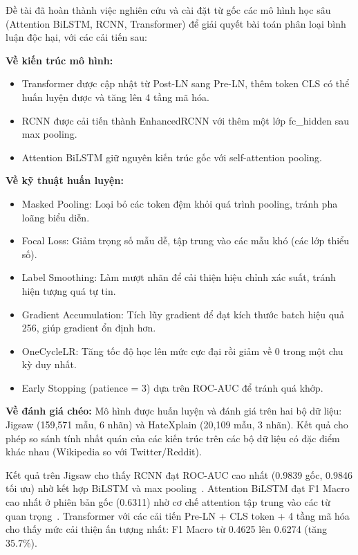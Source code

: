 \documentclass[../BTL.tex]{subfiles}
\begin{document}
Đề tài đã hoàn thành việc nghiên cứu và cài đặt từ gốc các mô hình học sâu (Attention BiLSTM, RCNN, Transformer) để giải quyết bài toán phân loại bình luận độc hại, với các cải tiến sau:

\textbf{Về kiến trúc mô hình:}
\begin{itemize}
    \item Transformer được cập nhật từ Post-LN sang Pre-LN, thêm token CLS có thể huấn luyện được và tăng lên 4 tầng mã hóa.
    \item RCNN được cải tiến thành EnhancedRCNN với thêm một lớp fc\_hidden sau max pooling.
    \item Attention BiLSTM giữ nguyên kiến trúc gốc với self-attention pooling.
\end{itemize}

\textbf{Về kỹ thuật huấn luyện:}
\begin{itemize}
    \item Masked Pooling: Loại bỏ các token đệm khỏi quá trình pooling, tránh pha loãng biểu diễn.
    \item Focal Loss: Giảm trọng số mẫu dễ, tập trung vào các mẫu khó (các lớp thiểu số).
    \item Label Smoothing: Làm mượt nhãn để cải thiện hiệu chỉnh xác suất, tránh hiện tượng quá tự tin.
    \item Gradient Accumulation: Tích lũy gradient để đạt kích thước batch hiệu quả 256, giúp gradient ổn định hơn.
    \item OneCycleLR: Tăng tốc độ học lên mức cực đại rồi giảm về 0 trong một chu kỳ duy nhất.
    \item Early Stopping (patience = 3) dựa trên ROC-AUC để tránh quá khớp.
\end{itemize}

\textbf{Về đánh giá chéo:} Mô hình được huấn luyện và đánh giá trên hai bộ dữ liệu: Jigsaw (159,571 mẫu, 6 nhãn) và HateXplain (20,109 mẫu, 3 nhãn). Kết quả cho phép so sánh tính nhất quán của các kiến trúc trên các bộ dữ liệu có đặc điểm khác nhau (Wikipedia so với Twitter/Reddit).

Kết quả trên Jigsaw cho thấy RCNN đạt ROC-AUC cao nhất (0.9839 gốc, 0.9846 tối ưu) nhờ kết hợp BiLSTM và max pooling~\cite{lai2015rcnn}. Attention BiLSTM đạt F1 Macro cao nhất ở phiên bản gốc (0.6311) nhờ cơ chế attention tập trung vào các từ quan trọng~\cite{yang2016hierarchical}. Transformer với các cải tiến Pre-LN + CLS token + 4 tầng mã hóa cho thấy mức cải thiện ấn tượng nhất: F1 Macro từ 0.4625 lên 0.6274 (tăng 35.7\%).
\end{document}
